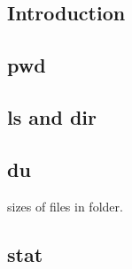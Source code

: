 
\subsection{Introduction}

\subsection{pwd}

\subsection{ls and dir}

\subsection{du}
sizes of files in folder.

\subsection{stat}

